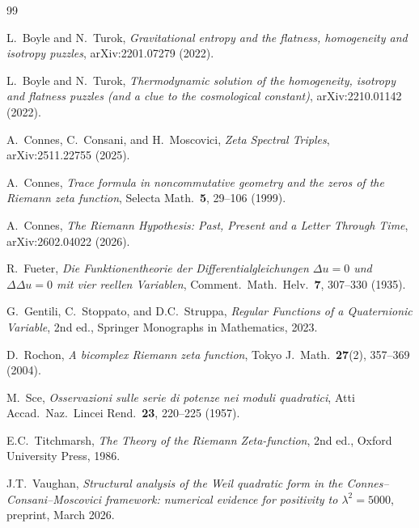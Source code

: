 \documentclass[11pt,a4paper]{article}
\theoremstyle{definition}
\begin{document}

\begin{thebibliography}{99}

 L.~Boyle and N.~Turok, \emph{Gravitational entropy and the flatness, homogeneity and isotropy puzzles}, arXiv:2201.07279 (2022).

 L.~Boyle and N.~Turok, \emph{Thermodynamic solution of the homogeneity, isotropy and flatness puzzles (and a clue to the cosmological constant)}, arXiv:2210.01142 (2022).

 A.~Connes, C.~Consani, and H.~Moscovici, \emph{Zeta Spectral Triples}, arXiv:2511.22755 (2025).

 A.~Connes, \emph{Trace formula in noncommutative geometry and the zeros of the Riemann zeta function}, Selecta Math.\ \textbf{5}, 29--106 (1999).

 A.~Connes, \emph{The Riemann Hypothesis: Past, Present and a Letter Through Time}, arXiv:2602.04022 (2026).

 R.~Fueter, \emph{Die Funktionentheorie der Differentialgleichungen $\Delta u = 0$ und $\Delta\Delta u = 0$ mit vier reellen Variablen}, Comment.\ Math.\ Helv.\ \textbf{7}, 307--330 (1935).

 G.~Gentili, C.~Stoppato, and D.C.~Struppa, \emph{Regular Functions of a Quaternionic Variable}, 2nd ed., Springer Monographs in Mathematics, 2023.

 D.~Rochon, \emph{A bicomplex Riemann zeta function}, Tokyo J.\ Math.\ \textbf{27}(2), 357--369 (2004).

 M.~Sce, \emph{Osservazioni sulle serie di potenze nei moduli quadratici}, Atti Accad.\ Naz.\ Lincei Rend.\ \textbf{23}, 220--225 (1957).

 E.C.~Titchmarsh, \emph{The Theory of the Riemann Zeta-function}, 2nd ed., Oxford University Press, 1986.

 J.T.~Vaughan, \emph{Structural analysis of the Weil quadratic form in the Connes--Consani--Moscovici framework: numerical evidence for positivity to $\lambda^2 = 5000$}, preprint, March 2026.

\end{thebibliography}
\end{document}
